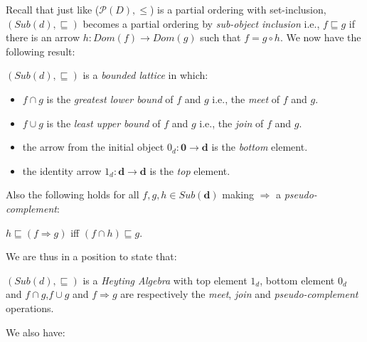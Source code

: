 Recall that just like ($\mathcal{P}(D), \leq$) is a partial ordering with set-inclusion, $(Sub(d), \sqsubseteq)$
becomes a partial ordering by \emph{sub-object inclusion} i.e., $f \sqsubseteq g$ if there is an arrow $h: Dom(f) \rightarrow Dom(g)$ such that $f = g \circ h$.\newline
We now have the following result:

\begin{prop}
	$(Sub(d),\sqsubseteq)$ is a \emph{bounded lattice} in which:
	\begin{itemize}
		\item $f \cap g$ is the \emph{greatest lower bound} of $f$ and $g$ i.e., the \emph{meet} of $f$ and $g$.
		\item $f \cup g$ is the \emph{least upper bound} of $f$ and $g$ i.e., the \emph{join} of $f$ and $g$.
		\item the arrow from the initial object $0_d : \textbf{0} \rightarrow \textbf{d}$ is the \emph{bottom} element.
		 \item the identity arrow $1_d : \textbf{d} \rightarrow \textbf{d}$ is the \emph{top} element.
	\end{itemize}
\end{prop}

Also the following holds for all $f,g,h \in Sub(\textbf{d})$ making $\Rightarrow$ a \emph{pseudo-complement}:

\begin{lem}
	$h \sqsubseteq (f \Rightarrow g) $ iff $ (f \cap h) \sqsubseteq g $.
\end{lem}

We are thus in a position to state that:

\begin{thm}
	$(Sub(d),\sqsubseteq)$ is a \emph{Heyting Algebra} with top element $1_d$, bottom element $0_d$ and $f\cap g$,$f \cup g$ and $f \Rightarrow g$ are respectively the \emph{meet}, \emph{join} and \emph{pseudo-complement} operations.
\end{thm}

We also have:

